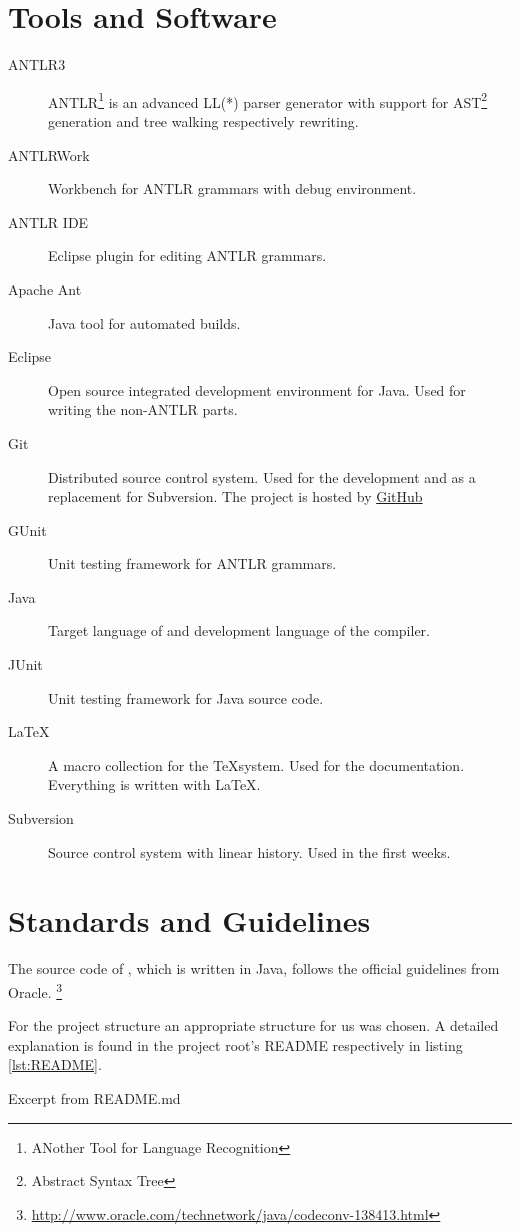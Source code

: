 \section{Tools and Software}
\begin{description}
	\item[ANTLR3] ANTLR\footnote{ANother Tool for Language Recognition} is an advanced LL(*) parser generator with support for AST\footnote{Abstract Syntax Tree} generation and tree walking respectively rewriting.
	\item[ANTLRWork] Workbench for ANTLR grammars with debug environment.
	\item[ANTLR IDE] Eclipse plugin for editing ANTLR grammars.
	\item[Apache Ant] Java tool for automated builds.
	\item[Eclipse] Open source integrated development environment for Java. Used for writing the non-ANTLR parts.
	\item[Git] Distributed source control system. Used for the development and as a replacement for Subversion. The project is hosted by \href{https://www.github.com/rubenbaer/ooplss}{GitHub}
	\item[GUnit] Unit testing framework for ANTLR grammars.
	\item[Java] Target language of \ooplss and development language of the compiler.
	\item[JUnit] Unit testing framework for Java source code.
	\item[\LaTeX] A macro collection for the \TeX system. Used for the documentation. Everything is written with \LaTeX.
	\item[Subversion] Source control system with linear history. Used in the first weeks.
\end{description}

\section{Standards and Guidelines}
The source code of \ooplss, which is written in Java, follows the official
guidelines from Oracle.
\footnote{\href{http://www.oracle.com/technetwork/java/codeconv-138413.html}{http://www.oracle.com/technetwork/java/codeconv-138413.html}}

For the project structure an appropriate structure for us was chosen.
A detailed explanation is found in the project root's README
respectively in listing \ref{lst:README}.

\begin{listing}
	\caption{Excerpt from README.md}
	\label{lst:README}
\end{listing}
